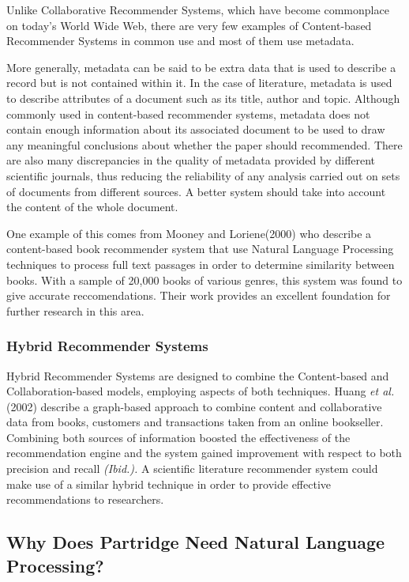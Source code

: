 Unlike Collaborative Recommender Systems, which have become commonplace on
today's World Wide Web, there are very few examples of Content-based
Recommender Systems in common use and most of them use metadata. 

More generally, metadata can be said to be extra data that is used to describe
a record but is not contained within it. In the case of literature, metadata is
used to describe attributes of a document such as its title, author and topic.
Although commonly used in content-based recommender systems, metadata does not
contain enough information about its associated document to be used to draw any
meaningful conclusions about whether the paper should recommended. There are
also many discrepancies in the quality of metadata provided by different
scientific journals, thus reducing the reliability of any analysis carried out
on sets of documents from different sources\cite{palepumeta}. A better system
should take into account the content of the whole document.

One example of this comes from Mooney and Loriene(2000) who describe a
content-based book recommender system that use Natural Language Processing
techniques to process full text passages in order to determine similarity
between books\cite{Mooney:2000:CBR:336597.336662}. With a sample of 20,000
books of various genres, this system was found to give accurate
reccomendations. Their work provides an excellent foundation for further
research in this area.

\subsubsection{ Hybrid Recommender Systems }

Hybrid Recommender Systems are designed to combine the Content-based and
Collaboration-based models, employing aspects of both techniques. Huang
\emph{et al.}(2002) describe a graph-based approach to combine content and
collaborative data from books, customers and transactions taken from an online
bookseller\cite{Huang:2002:GRS:544220.544231}. Combining both sources of
information boosted the effectiveness of the recommendation engine and
the system gained improvement with respect to both precision and
recall \emph{(Ibid.).} A scientific literature recommender system could make use
of a similar hybrid technique in order to provide effective recommendations to
researchers.


\subsection{Why Does Partridge Need Natural Language Processing?}

